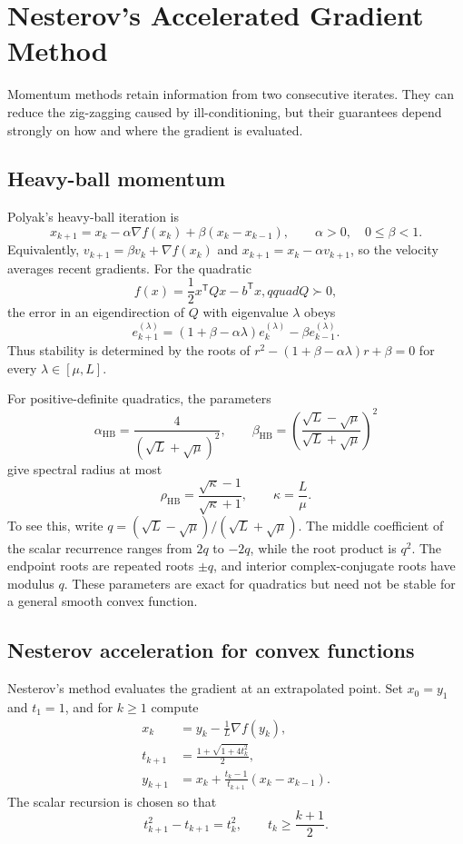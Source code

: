 \documentclass[12pt,oneside]{book}
\numberwithin{equation}{section}
\theoremstyle{definition}
\theoremstyle{plain}
\theoremstyle{remark}
\begin{document}
\section{Nesterov’s Accelerated Gradient Method}

Momentum methods retain information from two consecutive iterates. They can
reduce the zig-zagging caused by ill-conditioning, but their guarantees
depend strongly on how and where the gradient is evaluated.

\subsection{Heavy-ball momentum}

Polyak's heavy-ball iteration is
\begin{equation}\label{eq:heavy-ball}
 x_{k+1}=x_k-\alpha\nabla f(x_k)+\beta(x_k-x_{k-1}),
 \qquad \alpha>0,\quad0\leq\beta<1.
\end{equation}
Equivalently, $v_{k+1}=\beta v_k+\nabla f(x_k)$ and
$x_{k+1}=x_k-\alpha v_{k+1}$, so the velocity averages recent gradients.
For the quadratic
\[
 f(x)=\frac12x^\mathsf TQx-b^\mathsf Tx,qquad Q\succ0,
\]
the error in an eigendirection of $Q$ with eigenvalue $\lambda$ obeys
\[
 e_{k+1}^{(\lambda)}=(1+\beta-\alpha\lambda)e_k^{(\lambda)}
       -\beta e_{k-1}^{(\lambda)}.
\]
Thus stability is determined by the roots of
$r^2-(1+\beta-\alpha\lambda)r+\beta=0$ for every
$\lambda\in[\mu,L]$.

For positive-definite quadratics, the parameters
\[
 \alpha_{\mathrm{HB}}=\frac{4}{(\sqrt L+\sqrt\mu)^2},
 \qquad
 \beta_{\mathrm{HB}}=\left(\frac{\sqrt L-\sqrt\mu}
                                  {\sqrt L+\sqrt\mu}\right)^2
\]
give spectral radius at most
\[
 \rho_{\mathrm{HB}}=\frac{\sqrt\kappa-1}{\sqrt\kappa+1},
 \qquad \kappa=\frac L\mu.
\]
To see this, write $q=(\sqrt L-\sqrt\mu)/(\sqrt L+\sqrt\mu)$. The middle
coefficient of the scalar recurrence ranges from $2q$ to $-2q$, while the
root product is $q^2$. The endpoint roots are repeated roots $\pm q$, and
interior complex-conjugate roots have modulus $q$. These parameters are exact
for quadratics but need not be stable for a general smooth convex function.

\subsection{Nesterov acceleration for convex functions}

Nesterov's method evaluates the gradient at an extrapolated point. Set
$x_0=y_1$ and $t_1=1$, and for $k\geq1$ compute
\begin{align}
 x_k&=y_k-\frac1L\nabla f(y_k),\label{eq:nag-step}\\
 t_{k+1}&=\frac{1+\sqrt{1+4t_k^2}}{2},\label{eq:nag-t}\\
 y_{k+1}&=x_k+\frac{t_k-1}{t_{k+1}}(x_k-x_{k-1}).\label{eq:nag-extra}
\end{align}
The scalar recursion is chosen so that
\[
 t_{k+1}^2-t_{k+1}=t_k^2,
 \qquad t_k\geq\frac{k+1}{2}.
\]
\end{document}
